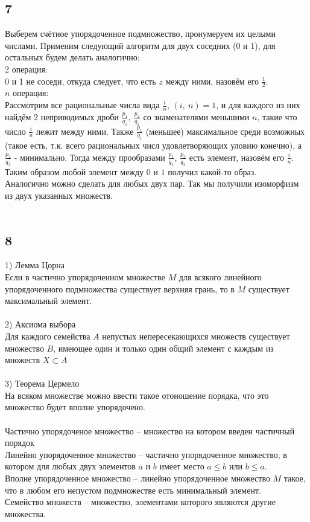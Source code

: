 		\subsection{7}
		Выберем счётное упорядоченное подмножество, пронумеруем их целыми числами. Применим следующий алгоритм для двух соседних (0 и 1), для остальных будем делать аналогично:\\
		2 операция: \\
		0 и 1 не соседи, откуда следует, что есть $z$ между ними, назовём его $\frac{1}{2}$.\\
		$n$  операция:\\
		Рассмотрим все рациональные числа вида $\frac{i}{n}$, $(i,\: n) = 1$, и для каждого из них найдём 2 неприводимых дроби $\frac{p_1}{q_1},\: \frac{p_2}{q_2}$ со знаменателями меньшими $n$, такие что число $\frac{i}{n}$ лежит между ними. Также $\frac{p_1}{q_1}$ (меньшее) максимальное среди возможных (такое есть, т.к. всего рациональных числ удовлетворяющих уловию конечно), а $\frac{p_2}{q_2}$ - минимально. Тогда между прообразами $\frac{p_1}{q_1}$, $\frac{p_2}{q_2}$ есть элемент, назовём его $\frac{i}{n}$. Таким образом любой элемент между $0$ и $1$ получил какой-то образ.\\
		Аналогично можно сделать для любых двух пар. Так мы получили изоморфизм из двух указанных множеств.
		\\ \\		
		\subsection{8}
		1) $\textbf{Лемма Цорна}$\\
		Если в частично упорядоченном множестве $M$ для всякого линейного упорядоченного подмножества существует верхняя грань, то в $M$ существует максимальный элемент.\\ \\
		2) $\textbf{Аксиома выбора}$\\
		Для каждого семейства $A$ непустых непересекающихся множеств существует множество $B$, имеющее один и только один общий элемент с каждым из множеств $X \subset A$\\ \\
		3) $\textbf{Теорема Цермело}$\\
		На всяком множестве можно ввести такое отоношение порядка, что это множество будет вполне упорядочено.\\
		\\
		$\textbf{Частично упорядоченое множество}$ -- множество на котором введен частичный порядок\\
		$\textbf{Линейно упорядоченное множество}$ -- частично упорядоченное множество, в котором для любых двух элементов $a$ и $b$ имеет место $a \leqslant b$ или $b\leqslant a$.\\
		$\textbf{Вполне упорядоченное множество}$ -- линейно упорядоченное множество $M$ такое, что в любом его непустом подмножестве есть минимальный элемент.\\
		$\textbf{Семейство множеств}$ -- множество, элементами которого являются другие множества.\\
		\\ \\
